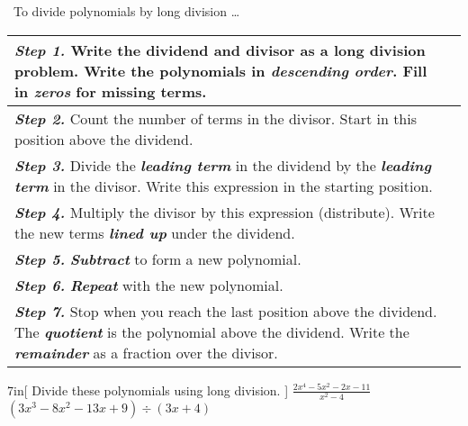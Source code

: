 \begin{myConcept}{~To divide polynomials by long division \dots}
    \begin{center}
        \begin{tabular}{m{}|p{}}
            {\bfseries\itshape Step 1.}
            Write the dividend and divisor
            as a long division problem.
            Write the polynomials in {\bfseries\itshape descending order}.
            Fill in {\bfseries\itshape zeros} for missing terms. 
            & 
            \rule{0in}{3\baselineskip}
            \\ \hline
            {\bfseries\itshape Step 2.}
            Count the number of terms in the divisor.
            Start in this position above the dividend.
            & 
            \rule{0in}{4\baselineskip}
            \\ \hline
            {\bfseries\itshape Step 3.}
            Divide the {\bfseries\itshape leading term} in the dividend 
            by the {\bfseries\itshape leading term} in the divisor.
            Write this expression in the starting position.
            & 
            \rule{0in}{4\baselineskip}
            \\ \hline
            {\bfseries\itshape Step 4.}
            Multiply the divisor by this expression (distribute).
            Write the new terms {\bfseries\itshape lined up} under the dividend.
            & 
            \rule{0in}{4\baselineskip}
            \\ \hline
            {\bfseries\itshape Step 5.}
            {\bfseries\itshape Subtract} to form a new polynomial.
            & 
            \rule{0in}{7\baselineskip}
            \\ \hline
            {\bfseries\itshape Step 6.}
            {\bfseries\itshape Repeat} with the new polynomial.
            & 
            \rule{0in}{9\baselineskip}
            \\ \hline
            {\bfseries\itshape Step 7.}
            Stop when you reach the last position above the dividend.
            The {\bfseries\itshape quotient} is the polynomial above the dividend.
            Write the {\bfseries\itshape remainder} as a fraction over the divisor.
            & 
            \\ 
        \end{tabular}
    \end{center}
\end{myConcept}


\begin{my2Problems}[\large]{7in}[
    Divide these polynomials using long division.
    ]
    {
        $\frac
            {2x^4 - 5x^2 - 2x - 11} 
            {x^2 - 4}
        $
    }
    {
        $
            (3x^3 - 8x^2 - 13x + 9) 
            \div
            (3x+4)
        $
    }
\end{my2Problems}




